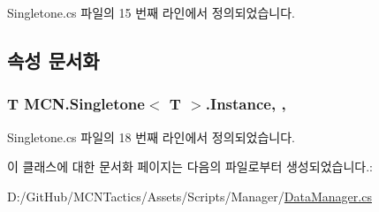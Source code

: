 Singletone.\+cs 파일의 15 번째 라인에서 정의되었습니다.



\subsection{속성 문서화}
\subsubsection[{\texorpdfstring{Instance}{Instance}}]{\setlength{\rightskip}{0pt plus 5cm}T {\bf M\+C\+N.\+Singletone}$<$ T $>$.Instance\hspace{0.3cm}{\ttfamily [static]}, {\ttfamily [get]}, {\ttfamily [inherited]}}\hypertarget{class_m_c_n_1_1_singletone_a46dbbebd93e96a9592a9803c51f35602}{}\label{class_m_c_n_1_1_singletone_a46dbbebd93e96a9592a9803c51f35602}


Singletone.\+cs 파일의 18 번째 라인에서 정의되었습니다.



이 클래스에 대한 문서화 페이지는 다음의 파일로부터 생성되었습니다.\+:\begin{DoxyCompactItemize}
\item 
D\+:/\+Git\+Hub/\+M\+C\+N\+Tactics/\+Assets/\+Scripts/\+Manager/\hyperlink{_data_manager_8cs}{Data\+Manager.\+cs}\end{DoxyCompactItemize}

